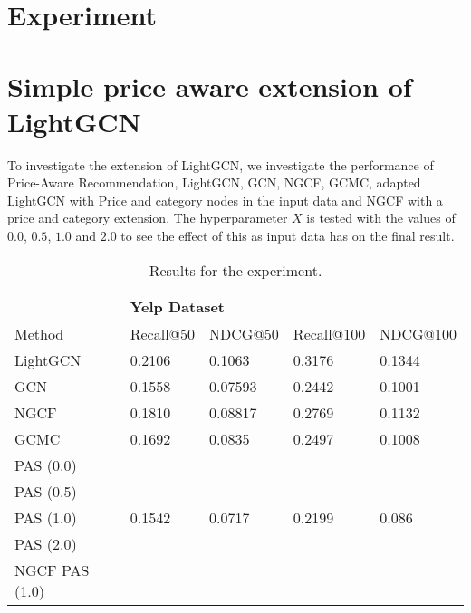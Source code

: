 \section{Experiment}


\section{Simple price aware extension of LightGCN}
To investigate the extension of LightGCN, we investigate the performance of Price-Aware Recommendation, LightGCN, GCN, NGCF, GCMC, adapted LightGCN with Price and category nodes in the input data and NGCF with a price and category extension.
The hyperparameter $X$ is tested with the values of $0.0$, $0.5$, $1.0$ and $2.0$ to see the effect of this as input data has on the final result.
\begin{table*}[h!]
    \centering
    \begin{tabular}{|l|l|l|l|l|}
        \hline
        \rowcolor[HTML]{FFFFFF}
                       & \multicolumn{4}{l|}{\cellcolor[HTML]{FFFFFF}Yelp Dataset}                                   \\ \hline
        Method         & Recall@50                                                 & NDCG@50 & Recall@100 & NDCG@100 \\ \hline
        LightGCN       & 0.2106                                                    & 0.1063  & 0.3176     & 0.1344   \\ \hline
        GCN            & 0.1558                                                    & 0.07593 & 0.2442     & 0.1001   \\ \hline
        NGCF           & 0.1810                                                    & 0.08817 & 0.2769     & 0.1132   \\ \hline
        GCMC           & 0.1692                                                    & 0.0835  & 0.2497     & 0.1008   \\ \hline
        PAS (0.0)      &                                                           &         &            &          \\ \hline
        PAS (0.5)      &                                                           &         &            &          \\ \hline
        PAS (1.0)      & 0.1542                                                    & 0.0717  & 0.2199     & 0.086    \\ \hline
        PAS (2.0)      &                                                           &         &            &          \\ \hline
        NGCF PAS (1.0) &                                                           &         &            &          \\ \hline
    \end{tabular}
    \caption{Results for the experiment.}
    \label{tab:results}
\end{table*}
